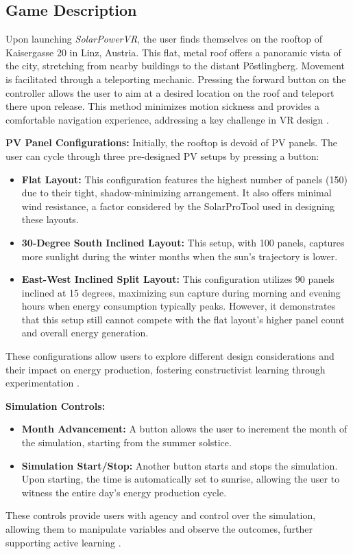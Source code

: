 \documentclass[draft, final]{vutinfth} %
\begin{document}
\subsection{Game Description}

Upon launching \textit{SolarPowerVR}, the user finds themselves on the rooftop of Kaisergasse 20 in Linz, Austria. This flat, metal roof offers a panoramic vista of the city, stretching from nearby buildings to the distant Pöstlingberg. Movement is facilitated through a teleporting mechanic. Pressing the forward button on the controller allows the user to aim at a desired location on the roof and teleport there upon release. This method minimizes motion sickness and provides a comfortable navigation experience, addressing a key challenge in VR design \cite{Winn2002Immersion}.

\textbf{PV Panel Configurations:} Initially, the rooftop is devoid of PV panels. The user can cycle through three pre-designed PV setups by pressing a button:
\begin{itemize}
    \item \textbf{Flat Layout:} This configuration features the highest number of panels (150) due to their tight, shadow-minimizing arrangement. It also offers minimal wind resistance, a factor considered by the SolarProTool used in designing these layouts.
    \item \textbf{30-Degree South Inclined Layout:} This setup, with 100 panels, captures more sunlight during the winter months when the sun's trajectory is lower.
    \item \textbf{East-West Inclined Split Layout:} This configuration utilizes 90 panels inclined at 15 degrees, maximizing sun capture during morning and evening hours when energy consumption typically peaks. However, it demonstrates that this setup still cannot compete with the flat layout's higher panel count and overall energy generation.
\end{itemize}
These configurations allow users to explore different design considerations and their impact on energy production, fostering constructivist learning through experimentation \cite{Mikropoulos2011VrEducational}.

\textbf{Simulation Controls:}
\begin{itemize}
    \item \textbf{Month Advancement:} A button allows the user to increment the month of the simulation, starting from the summer solstice.
    \item \textbf{Simulation Start/Stop:} Another button starts and stops the simulation. Upon starting, the time is automatically set to sunrise, allowing the user to witness the entire day's energy production cycle.
\end{itemize}
These controls provide users with agency and control over the simulation, allowing them to manipulate variables and observe the outcomes, further supporting active learning \cite{Dalgarno2010Learning}.
\end{document}
